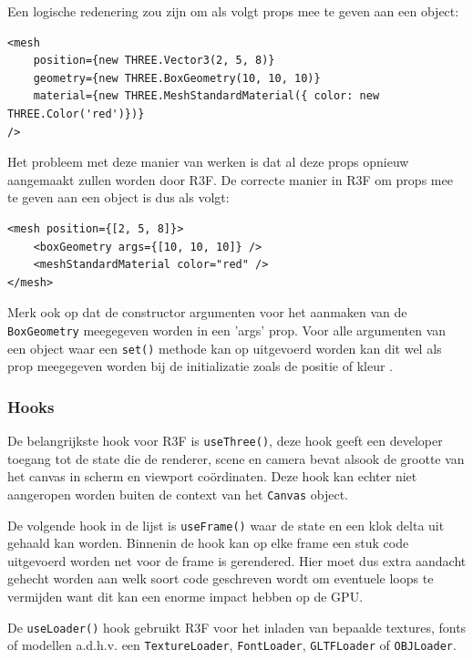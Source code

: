 Een logische redenering zou zijn om als volgt props mee te geven aan een object:

\begin{lstlisting}
<mesh
	position={new THREE.Vector3(2, 5, 8)}
	geometry={new THREE.BoxGeometry(10, 10, 10)}
	material={new THREE.MeshStandardMaterial({ color: new THREE.Color('red')})}
/>
\end{lstlisting}

Het probleem met deze manier van werken is dat al deze props opnieuw aangemaakt zullen worden door R3F. De correcte manier in R3F om props mee te geven aan een object is dus als volgt:

\begin{lstlisting}
<mesh position={[2, 5, 8]}>
	<boxGeometry args={[10, 10, 10]} />
	<meshStandardMaterial color="red" />
</mesh>
\end{lstlisting}

Merk ook op dat de constructor argumenten voor het aanmaken van de \texttt{BoxGeometry} meegegeven worden in een 'args' prop. Voor alle argumenten van een object waar een \texttt{set()} methode kan op uitgevoerd worden kan dit wel als prop meegegeven worden bij de initializatie zoals de positie of kleur \autocite{reactThreeFiber2023}.

\subsubsection{Hooks}

De belangrijkste hook voor R3F is \texttt{useThree()}, deze hook geeft een developer toegang tot de state die de renderer, scene en camera bevat alsook de grootte van het canvas in scherm en viewport coördinaten. Deze hook kan echter niet aangeropen worden buiten de context van het \texttt{Canvas} object.

De volgende hook in de lijst is \texttt{useFrame()} waar de state en een klok delta uit gehaald kan worden. Binnenin de hook kan op elke frame een stuk code uitgevoerd worden net voor de frame is gerendered. Hier moet dus extra aandacht gehecht worden aan welk soort code geschreven wordt om eventuele loops te vermijden want dit kan een enorme impact hebben op de GPU.

De \texttt{useLoader()} hook gebruikt R3F voor het inladen van bepaalde textures, fonts of modellen a.d.h.v. een \texttt{TextureLoader}, \texttt{FontLoader}, \texttt{GLTFLoader} of \texttt{OBJLoader}.
